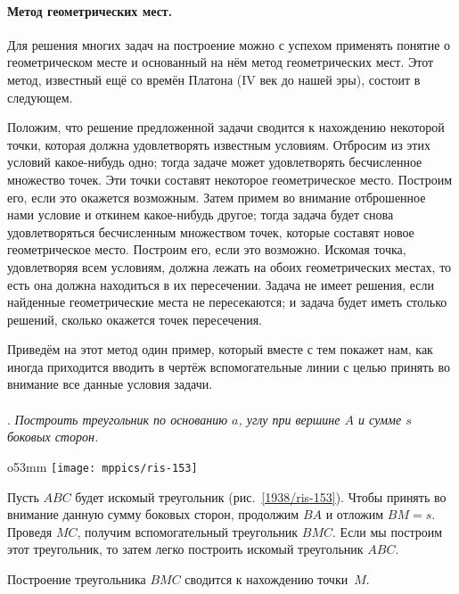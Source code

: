 \paragraph{Метод геометрических мест.}\label{1938/133}
Для решения многих задач на построение можно с успехом применять понятие о геометрическом месте и основанный на нём метод геометрических мест.
Этот метод, известный ещё со времён Платона (IV век до нашей эры), состоит в следующем.

Положим, что решение предложенной задачи сводится к нахождению некоторой точки, которая должна удовлетворять известным условиям.
Отбросим из этих условий какое-нибудь одно;
тогда задаче может удовлетворять бесчисленное множество точек.
Эти точки составят некоторое геометрическое место.
Построим его, если это окажется возможным.
Затем примем во внимание отброшенное нами условие и откинем какое-нибудь другое;
тогда задача будет снова удовлетворяться бесчисленным множеством точек, которые составят новое геометрическое место.
Построим его, если это возможно.
Искомая точка, удовлетворяя всем условиям, должна лежать на обоих геометрических местах, то есть она должна находиться в их пересечении.
Задача не имеет решения, если найденные геометрические места не пересекаются;
и задача будет иметь столько решений, сколько окажется точек пересечения.

Приведём на этот метод один пример, который вместе с тем покажет нам, как иногда приходится вводить в чертёж вспомогательные линии с целью принять во внимание все данные условия задачи.

\paragraph{}\label{1938/134}
.
\emph{Построить треугольник по основанию $a$, углу при вершине $A$ и сумме $s$ боковых сторон.}

\begin{wrapfigure}{o}{53mm}
\centering
\texttt{[image: mppics/ris-153]}
\caption{}\label{1938/ris-153}
\end{wrapfigure}

Пусть $ABC$ будет искомый треугольник (рис.~\ref{1938/ris-153}).
Чтобы принять во внимание данную сумму боковых сторон, продолжим $BA$ и отложим $BM=s$.
Проведя $MC$, получим вспомогательный треугольник $BMC$.
Если мы построим этот треугольник, то затем легко построить искомый треугольник $ABC$.

Построение треугольника $BMC$ сводится к нахождению точки~$M$.

